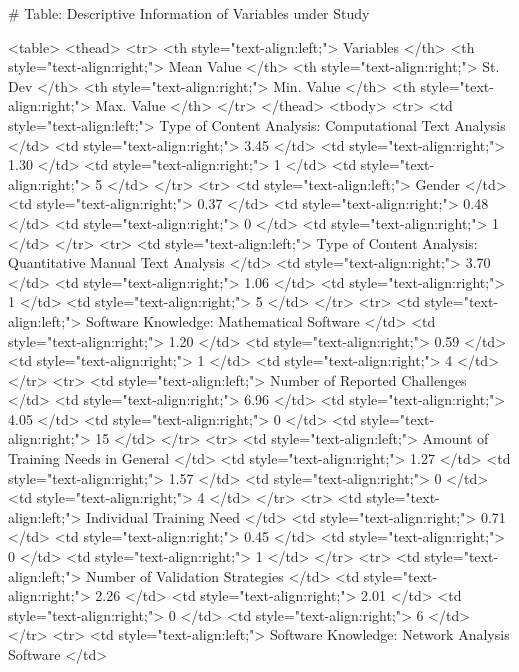 # Table: Descriptive Information of Variables under Study 

<table>
 <thead>
  <tr>
   <th style="text-align:left;"> Variables </th>
   <th style="text-align:right;"> Mean Value </th>
   <th style="text-align:right;"> St. Dev </th>
   <th style="text-align:right;"> Min. Value </th>
   <th style="text-align:right;"> Max. Value </th>
  </tr>
 </thead>
<tbody>
  <tr>
   <td style="text-align:left;"> Type of Content Analysis: Computational Text Analysis </td>
   <td style="text-align:right;"> 3.45 </td>
   <td style="text-align:right;"> 1.30 </td>
   <td style="text-align:right;"> 1 </td>
   <td style="text-align:right;"> 5 </td>
  </tr>
  <tr>
   <td style="text-align:left;"> Gender </td>
   <td style="text-align:right;"> 0.37 </td>
   <td style="text-align:right;"> 0.48 </td>
   <td style="text-align:right;"> 0 </td>
   <td style="text-align:right;"> 1 </td>
  </tr>
  <tr>
   <td style="text-align:left;"> Type of Content Analysis: Quantitative Manual Text Analysis </td>
   <td style="text-align:right;"> 3.70 </td>
   <td style="text-align:right;"> 1.06 </td>
   <td style="text-align:right;"> 1 </td>
   <td style="text-align:right;"> 5 </td>
  </tr>
  <tr>
   <td style="text-align:left;"> Software Knowledge: Mathematical Software </td>
   <td style="text-align:right;"> 1.20 </td>
   <td style="text-align:right;"> 0.59 </td>
   <td style="text-align:right;"> 1 </td>
   <td style="text-align:right;"> 4 </td>
  </tr>
  <tr>
   <td style="text-align:left;"> Number of Reported Challenges </td>
   <td style="text-align:right;"> 6.96 </td>
   <td style="text-align:right;"> 4.05 </td>
   <td style="text-align:right;"> 0 </td>
   <td style="text-align:right;"> 15 </td>
  </tr>
  <tr>
   <td style="text-align:left;"> Amount of Training Needs in General </td>
   <td style="text-align:right;"> 1.27 </td>
   <td style="text-align:right;"> 1.57 </td>
   <td style="text-align:right;"> 0 </td>
   <td style="text-align:right;"> 4 </td>
  </tr>
  <tr>
   <td style="text-align:left;"> Individual Training Need </td>
   <td style="text-align:right;"> 0.71 </td>
   <td style="text-align:right;"> 0.45 </td>
   <td style="text-align:right;"> 0 </td>
   <td style="text-align:right;"> 1 </td>
  </tr>
  <tr>
   <td style="text-align:left;"> Number of Validation Strategies </td>
   <td style="text-align:right;"> 2.26 </td>
   <td style="text-align:right;"> 2.01 </td>
   <td style="text-align:right;"> 0 </td>
   <td style="text-align:right;"> 6 </td>
  </tr>
  <tr>
   <td style="text-align:left;"> Software Knowledge: Network Analysis Software </td>
